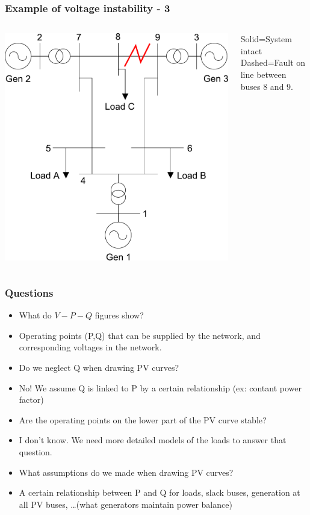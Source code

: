 \documentclass{beamer}
\begin{document}
\begin{frame}[label=examplecont]
\frametitle{Example of voltage instability - 3}
\begin{columns}
\includegraphics[width=\textwidth]{Figs/Ieee9bus_fault89.pdf}

Solid=System intact\\
Dashed=Fault on line between buses 8 and 9.
\end{columns}
\end{frame}

\begin{frame}
  \frametitle{Questions}
  \begin{itemize}[<visible@+->]
  \item What do $V-P-Q$ figures show?
  \item Operating points (P,Q) that can be supplied by the network, and corresponding voltages in the network.
  \item Do we neglect Q when drawing PV curves?
  \item No! We assume Q is linked to P by a certain relationship (ex: contant power factor)
  \item Are the operating points on the lower part of the PV curve stable?
  \item I don't know. We need more detailed models of the loads to answer that question.
  \item What assumptions do we made when drawing PV curves?
  \item A certain relationship between P and Q for loads, slack buses, generation at all PV buses, \ldots (what generators maintain power balance)
  \end{itemize}
\end{frame}
\end{document}
